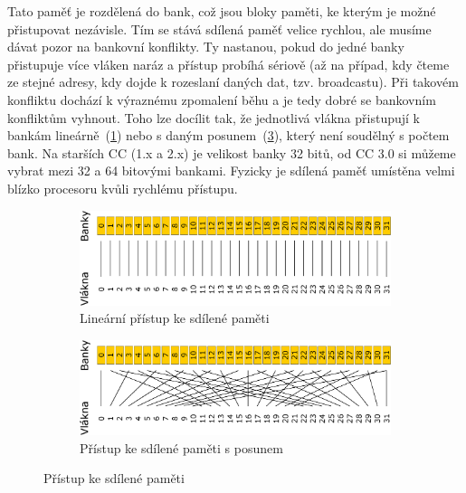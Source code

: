 \begin{description}
Tato paměť je rozdělená do bank, což jsou bloky paměti, ke kterým je možné přistupovat nezávisle. Tím se stává sdílená paměť velice rychlou, ale musíme dávat pozor na bankovní konflikty. Ty nastanou, pokud do jedné banky přistupuje více vláken naráz a přístup probíhá sériově (až na případ, kdy čteme ze stejné adresy, kdy dojde k rozeslaní daných dat, tzv. broadcastu). Při takovém konfliktu dochází k výraznému zpomalení běhu a je tedy dobré se bankovním konfliktům vyhnout. Toho lze docílit tak, že jednotlivá vlákna přistupují k bankám lineárně~(\ref{fig:linearaccess}) nebo s daným posunem~(\ref{fig:strideaccess}), který není soudělný s počtem bank. Na starších CC (1.x a 2.x) je velikost banky 32 bitů, od CC 3.0 si můžeme vybrat mezi 32 a 64 bitovými bankami. Fyzicky je sdílená paměť umístěna velmi blízko procesoru kvůli rychlému přístupu. 
\end{description}

\begin{figure}[h]
\centering
\begin{subfigure}{1.0\textwidth}
  \centering
  \includegraphics[width=.9\linewidth]{img/sharedMemoryLinearAccess.eps}
  \caption{Lineární přístup ke sdílené paměti}
  \label{fig:linearaccess}
\end{subfigure}
\begin{subfigure}{1.0\textwidth}
  \centering
  \includegraphics[width=.9\linewidth]{img/sharedMemoryStrideAccess.eps}
  \caption{Přístup ke sdílené paměti s posunem}
  \label{fig:strideaccess}
\end{subfigure}
\caption{Přístup ke sdílené paměti}
\end{figure}

